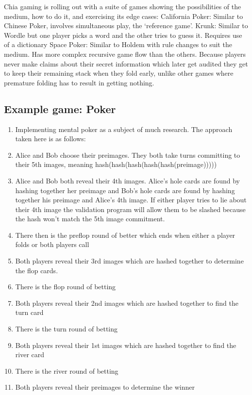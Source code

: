 \documentclass[a4paper]{article}
\begin{document}
\begin{multicols}{2}
Chia gaming is rolling out with a suite of games showing the possibilities of the medium, how to do it, and exercising its edge cases:
California Poker: Similar to Chinese Poker, involves simultaneous play, the ‘reference game’.
Krunk: Similar to Wordle but one player picks a word and the other tries to guess it. Requires use of a dictionary
Space Poker: Similar to Holdem with rule changes to suit the medium. Has more complex recursive game flow than the others. Because players never make claims about their secret information which later get audited they get to keep their remaining stack when they fold early, unlike other games where premature folding has to result in getting nothing.

\subsection{Example game: Poker}

\begin{enumerate}
    \item Implementing mental poker as a subject of much research. The approach taken here is as follows:
    \item Alice and Bob choose their preimages. They both take turns committing to their 5th images, meaning hash(hash(hash(hash(hash(preimage)))))
    \item Alice and Bob both reveal their 4th images. Alice’s hole cards are found by hashing together her preimage and Bob’s hole cards are found by hashing together his preimage and Alice’s 4th image. If either player tries to lie about their 4th image the validation program will allow them to be slashed because the hash won’t match the 5th image commitment.
    \item There then is the preflop round of better which ends when either a player folds or both players call
    \item Both players reveal their 3rd images which are hashed together to determine the flop cards.
    \item There is the flop round of betting
    \item Both players reveal their 2nd images which are hashed together to find the turn card
    \item There is the turn round of betting
    \item Both players reveal their 1st images which are hashed together to find the river card
    \item There is the river round of betting
    \item Both players reveal their preimages to determine the winner
\end{enumerate}


\end{multicols}
\end{document}
